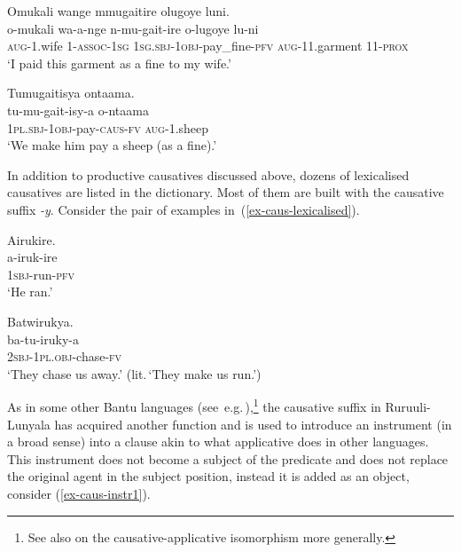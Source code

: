 \ea \label{ex-caus-gait}
\begin{xlist}
	\ex \label{ex-caus-gaitA}
	\glll	Omukali wange mmugaitire olugoye luni.\\
		o-mukali wa-a-nge n-mu-gait-ire o-lugoye lu-ni\\
		\textsc{aug}-1.wife 1-\textsc{assoc}-\textsc{1sg} \textsc{1sg.sbj}-\textsc{1obj}-pay\_fine-\textsc{pfv} \textsc{aug}-11.garment 11-\textsc{prox}\\
	\glt	‘I paid this garment as a fine to my wife.'
	
	\ex \label{ex-caus-gaitB}
	\glll	Tumugaitisya ontaama.\\
		tu-mu-gait-isy-a o-ntaama\\
		1\textsc{pl.sbj}-\textsc{1obj}-pay-\textsc{caus}-\textsc{fv} \textsc{aug}-1.sheep\\
	\glt	‘We make him pay a sheep (as a fine).' 
\end{xlist}
\z

In addition to productive causatives discussed above, dozens of lexicalised causatives are listed in the dictionary.  Most of them are built with the causative suffix \emph{-y}. Consider the pair of examples in~(\ref{ex-caus-lexicalised}).

\ea \label{ex-caus-lexicalised}
\begin{xlist}
	\ex \label{ex-caus-lexicaliseda}
	\glll	Airukire.\\
		a-iruk-ire\\
	 	\textsc{1sbj}-run-\textsc{pfv}\\
	\glt	‘He ran.’ 

	\ex \label{ex-caus-lexicalisedB}
	\glll	Batwirukya.\\
		ba-tu-iruky-a\\
		\textsc{2sbj}-\textsc{1pl.obj}-chase-\textsc{fv}\\
	\glt	‘They chase us away.’ (lit.\,`They make us run.')
\end{xlist}
\z

As in some other Bantu languages (see e.g.\,\citealt[175–176]{Schadebergetal2019Bantu}),\footnote{See also \citet[64–65]{Peterson2006Applicative} on the causative-applicative isomorphism more generally.} the causative suffix in Ru\-ruu\-li\hyp{}Lu\-nya\-la has acquired another function and is used to introduce an instrument (in a broad sense) into a clause akin to what applicative does in other languages. 
This instrument does not become a subject of the predicate and does not replace the original agent in the subject position, instead it is added as an object, consider (\ref{ex-caus-instr1}). 

